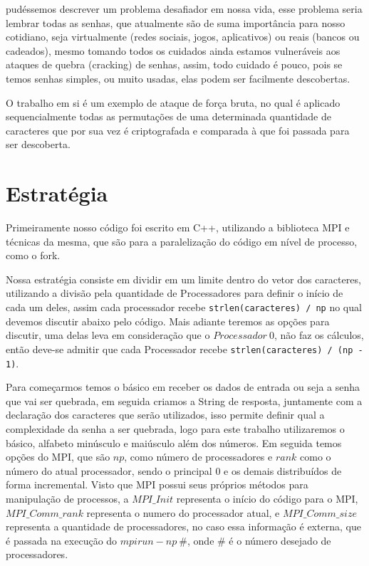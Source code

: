 \documentclass[10pt,journal,compsoc]{IEEEtran}
\begin{document}
\maketitle
\IEEEdisplaynontitleabstractindextext
\IEEEpeerreviewmaketitle
{}
 pudéssemos descrever um problema desafiador em nossa vida, esse problema seria lembrar todas as senhas, que atualmente são de suma importância para nosso cotidiano, seja virtualmente (redes sociais, jogos, aplicativos) ou reais (bancos ou cadeados), mesmo tomando todos os cuidados ainda estamos vulneráveis aos ataques de quebra (cracking) de senhas, assim, todo cuidado é pouco, pois se temos senhas simples, ou muito usadas, elas podem ser facilmente descobertas.

O trabalho em si é um exemplo de ataque de força bruta, no qual é aplicado sequencialmente todas as permutações de uma determinada quantidade de caracteres que por sua vez é criptografada e comparada à que foi passada para ser descoberta.

\section{Estratégia}
\label{sec:estrategia}
Primeiramente nosso código foi escrito em C++, utilizando a biblioteca MPI e técnicas da mesma, que são para a paralelização do código em nível de processo, como o fork.

Nossa estratégia consiste em dividir em um limite dentro do vetor dos caracteres, utilizando a divisão pela quantidade de Processadores para definir o início de cada um deles, assim cada processador recebe \texttt{strlen(caracteres) / np} no qual devemos discutir abaixo pelo código. Mais adiante teremos as opções para discutir, uma delas leva em consideração que o $Processador~0$, não faz os cálculos, então deve-se admitir que cada Processador recebe \texttt{strlen(caracteres) / (np - 1)}.

Para começarmos temos o básico em receber os dados de entrada ou seja a senha que vai ser quebrada, em seguida criamos a String de resposta, juntamente com a declaração dos caracteres que serão utilizados, isso permite definir qual a complexidade da senha a ser quebrada, logo para este trabalho utilizaremos o básico, alfabeto minúsculo e maiúsculo além dos números. Em seguida temos opções do MPI, que são $np$, como número de processadores e $rank$ como o número do atual processador, sendo o principal $0$ e os demais distribuídos de forma incremental. Visto que MPI possui seus próprios métodos para manipulação de processos, a $MPI\_Init$ representa o início do código para o MPI, $MPI\_Comm\_rank$ representa o numero do processador atual, e $MPI\_Comm\_size$ representa a quantidade de processadores, no caso essa informação é externa, que é passada na execução do $mpirun -np~\#$, onde $\#$ é o número desejado de processadores.
\end{document}
